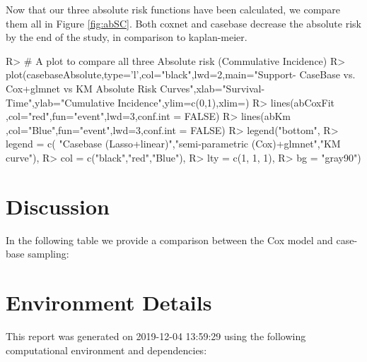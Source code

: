 \documentclass[
]{jss}
\begin{document}
Now that our three absolute risk functions have been calculated, we
compare them all in Figure \ref{fig:abSC}. Both coxnet and casebase
decrease the absolute risk by the end of the study, in comparison to
kaplan-meier.

\begin{CodeChunk}

\begin{CodeInput}
R> # A plot to compare all three Absolute risk (Commulative Incidence)
R> plot(casebaseAbsolute,type='l',col="black",lwd=2,main="Support- CaseBase vs. Cox+glmnet vs KM Absolute Risk Curves",xlab="Survival-Time",ylab="Cumulative Incidence",ylim=c(0,1),xlim=)
R> lines(abCoxFit ,col="red",fun="event",lwd=3,conf.int = FALSE)
R> lines(abKm ,col="Blue",fun="event",lwd=3,conf.int = FALSE)
R> legend("bottom", 
R>        legend = c( "Casebase (Lasso+linear)","semi-parametric (Cox)+glmnet","KM curve"), 
R>        col = c("black","red","Blue"),
R>        lty = c(1, 1, 1), 
R>        bg = "gray90")
\end{CodeInput}
\end{CodeChunk}

\hypertarget{discussion}{%
\section{Discussion}\label{discussion}}

In the following table we provide a comparison between the Cox model and
case-base sampling:

\hypertarget{environment-details}{%
\section{Environment Details}\label{environment-details}}

This report was generated on 2019-12-04 13:59:29 using the following
computational environment and dependencies:
\end{document}
